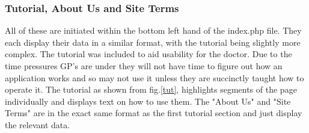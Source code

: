 \documentclass[11pt]{article}
\begin{document}
\subsubsection{Tutorial, About Us and Site Terms}
All of these are initiated within the bottom left hand of the index.php file. They each display their data in a similar format, with the tutorial being slightly more complex. The tutorial was included to aid usability for the doctor. Due to the time pressures GP's are under they will not have time to figure out how an application works and so may not use it unless they are succinctly taught how to operate it. The tutorial as shown from fig.\ref{tut}, highlights segments of the page individually and displays text on how to use them. The "About Us" and "Site Terms" are in the exact same format as the first tutorial section and just display the relevant data. 
\end{document}
